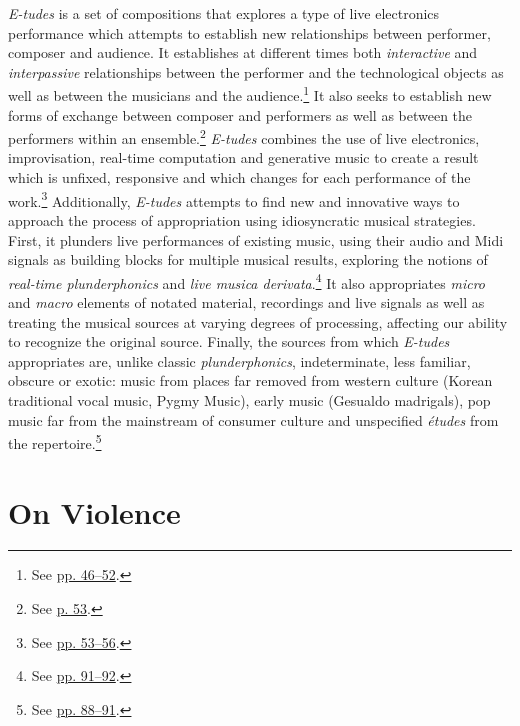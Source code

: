 \emph{E-tudes} is a set of compositions that explores a type of live electronics performance which attempts to establish new relationships between performer, composer and audience. It establishes at different times both \emph{interactive} and \emph{interpassive} relationships between the performer and the technological objects as well as between the musicians and the audience.\footnote{See \hyperlink{newrelationships}{pp. 46--52}.} It also seeks to establish new forms of exchange between composer and performers as well as between the performers within an ensemble.\footnote{See \hyperlink{ensembledy}{p. 53}.} \emph{E-tudes} combines the use of live electronics, improvisation, real-time computation and generative music to create a result which is unfixed, responsive and which changes for each performance of the work.\footnote{See \hyperlink{techcomp}{pp. 53--56}.} Additionally, \emph{E-tudes} attempts to find new and innovative ways to approach the process of appropriation using idiosyncratic musical strategies. First, it plunders live performances of existing music, using their audio and Midi signals as building blocks for multiple musical results, exploring the notions of \emph{real-time plunderphonics} and \emph{live musica derivata}.\footnote{See \hyperlink{realtimeplunderfuck}{pp. 91--92}.} It also appropriates \emph{micro} and \emph{macro} elements of notated material, recordings and live signals as well as treating the musical sources at varying degrees of processing, affecting our ability to recognize the original source. Finally, the sources from which \emph{E-tudes} appropriates are, unlike classic \emph{plunderphonics}, indeterminate, less familiar, obscure or exotic: music from places far removed from western culture (Korean traditional vocal music, Pygmy Music), early music (Gesualdo madrigals), pop music far from the mainstream of consumer culture and unspecified \emph{\'{e}tudes} from the repertoire.\footnote{See \hyperlink{appropstrat}{pp. 88--91}.}

\section{On Violence}
 
